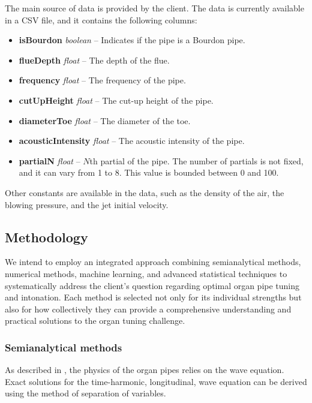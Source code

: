 \documentclass{psu-plan}
\begin{document}
The main source of data is provided by the client.
The data is currently available in a CSV file, and it contains the following
columns:
\begin{itemize}
    \item \textbf{isBourdon} \textit{boolean} -- Indicates if the pipe is a Bourdon pipe.
    \item \textbf{flueDepth} \textit{float} -- The depth of the flue.
    \item \textbf{frequency} \textit{float} -- The frequency of the pipe.
    \item \textbf{cutUpHeight} \textit{float} -- The cut-up height of the pipe.
    \item \textbf{diameterToe} \textit{float} -- The diameter of the toe.
    \item \textbf{acousticIntensity} \textit{float} -- The acoustic intensity of the pipe.
    \item \textbf{partialN} \textit{float} -- \(N\)th partial of the pipe.
        The number of partials is not fixed, and it can vary from 1 to 8.
        This value is bounded between 0 and 100.
\end{itemize}
Other constants are available in the data, such as the density of the air,
the blowing pressure, and the jet initial velocity.

\subsection{Methodology}


We intend to employ an integrated approach combining semianalytical methods, numerical methods, machine learning, 
and advanced statistical techniques to systematically address the client's question regarding optimal organ 
pipe tuning and intonation. 
Each method is selected not only for its individual strengths but also for how collectively they can provide 
a comprehensive understanding and practical solutions to the organ tuning challenge.


\subsubsection{Semianalytical methods}

As described in \autocite{2004RosFle-1}, the physics of the organ pipes relies
on the wave equation.
Exact solutions for the time-harmonic, longitudinal, wave equation can be
derived using the method of separation of variables.
\end{document}
